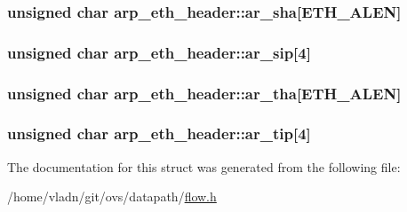 \subsubsection[{ar\+\_\+sha}]{\setlength{\rightskip}{0pt plus 5cm}unsigned char arp\+\_\+eth\+\_\+header\+::ar\+\_\+sha\mbox{[}E\+T\+H\+\_\+\+A\+L\+E\+N\mbox{]}}\label{structarp__eth__header_a569cddaf9ed4aa40b04b60958783e908}
\hypertarget{structarp__eth__header_ae584842ae04804b2f5cf3c26fb135961}{}
\subsubsection[{ar\+\_\+sip}]{\setlength{\rightskip}{0pt plus 5cm}unsigned char arp\+\_\+eth\+\_\+header\+::ar\+\_\+sip\mbox{[}4\mbox{]}}\label{structarp__eth__header_ae584842ae04804b2f5cf3c26fb135961}
\hypertarget{structarp__eth__header_a490c51d5f01a32e78c57d020ca2662f6}{}
\subsubsection[{ar\+\_\+tha}]{\setlength{\rightskip}{0pt plus 5cm}unsigned char arp\+\_\+eth\+\_\+header\+::ar\+\_\+tha\mbox{[}E\+T\+H\+\_\+\+A\+L\+E\+N\mbox{]}}\label{structarp__eth__header_a490c51d5f01a32e78c57d020ca2662f6}
\hypertarget{structarp__eth__header_a9ed88031c0dd2f554f1dc455e878945d}{}
\subsubsection[{ar\+\_\+tip}]{\setlength{\rightskip}{0pt plus 5cm}unsigned char arp\+\_\+eth\+\_\+header\+::ar\+\_\+tip\mbox{[}4\mbox{]}}\label{structarp__eth__header_a9ed88031c0dd2f554f1dc455e878945d}


The documentation for this struct was generated from the following file\+:\begin{DoxyCompactItemize}
\item 
/home/vladn/git/ovs/datapath/\hyperlink{flow_8h}{flow.\+h}\end{DoxyCompactItemize}
